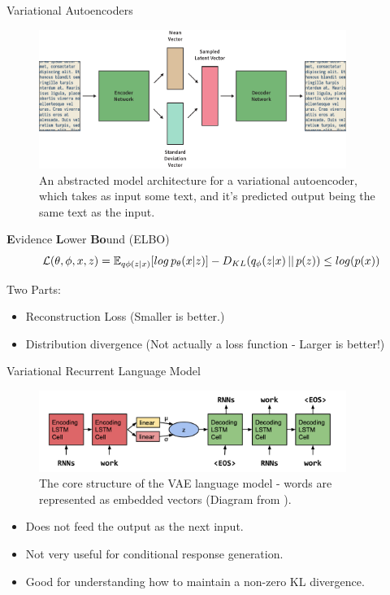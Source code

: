 \documentclass[aspectratio=169, 11pt]{beamer}
\begin{document}
\begin{frame}{Variational Autoencoders}
  \begin{figure}[!ht]
    \centering
    \includegraphics[width=100mm]{diagrams/variational_autoencoders.pdf}
    \caption{An abstracted model architecture for a variational autoencoder, which takes as input some text, and it's predicted output being the same text as the input.\label{vae}}
    \end{figure}
\end{frame}

\begin{frame}{\textbf{E}vidence \textbf{L}ower \textbf{Bo}und (ELBO)}
  \begin{equation}
    \label{eqn:elbo}
    \mathcal{L}(\theta, \phi, x, z) = \mathbb{E}_{q \phi (z|x)}[log \thinspace p_{\theta}(x|z)] - D_{KL}(q_{\phi}(z|x)\thinspace||\thinspace p(z)) \leq log (p(x))
  \end{equation}
  \begin{block}{Two Parts:}
    \begin{itemize}
      \item Reconstruction Loss (Smaller is better.)
      \item Distribution divergence (Not actually a loss function - Larger is better!)
    \end{itemize}
  \end{block}
\end{frame}


\begin{frame}{Variational Recurrent Language Model}
  \begin{figure}[!ht]
    \centering
    \includegraphics[width=100mm]{diagrams/seq2seqvae.png}
    \caption{The core structure of the VAE language model - words are represented as embedded vectors (Diagram from \cite{bowman_generating_2015}). \label{vae_seq2seq}}
  \end{figure}

  \begin{itemize}
    \item Does not feed the output as the next input.
    \item Not very useful for conditional response generation.
    \item Good for understanding how to maintain a non-zero KL divergence.
  \end{itemize}
\end{frame}
\end{document}
